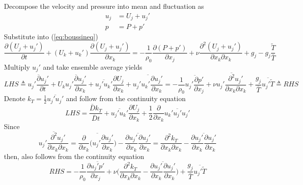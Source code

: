 \documentclass[paper=a4, fontsize=11pt]{scrartcl} %
\numberwithin{equation}{section} %
\numberwithin{figure}{section} %
\numberwithin{table}{section} %
\begin{document}
 	Decompose the velocity and pressure into mean and fluctuation as
 	\begin{equation}
 		\begin{aligned}
 			u_j & = U_j + u_j'\\
 			p & = P + p'
 		\end{aligned}
 	\end{equation}
 	Substitute into (\ref{eq:boussineq})
 	\begin{equation}
 		\frac{\partial (U_j + u_j')}{\partial t} + (U_k + u_k') \frac{\partial (U_j + u_j')}{\partial x_k} = - \frac{1}{\rho_0} \frac{\partial (P + p')}{\partial x_j} + \nu \frac{\partial^2 (U_j + u_j')}{\partial x_k \partial x_k} + g_j - g_j \frac{\tilde{T}}{\bar{T}}
 	\end{equation}
 	Multiply $u_j'$ and take ensemble average yields
 	\begin{equation}\label{eq:ea}
 		LHS \triangleq \overline{u_j' \frac{\partial u_j'}{\partial t}} + U_k \overline{u_j' \frac{\partial u_j'}{\partial x_k}} + \overline{u_j' u_k'}\frac{\partial U_j}{\partial x_k} + \overline{u_j' u_k' \frac{\partial u_j'}{\partial x_k}} = -\frac{1}{\rho_0} \overline{u_j' \frac{\partial p'}{\partial x_j}} + \nu \overline{u_j'\frac{\partial^2 u_j'}{\partial x_k \partial x_k}} + \frac{g_j}{\bar{T}}\overline{u_j' \tilde{T}} \triangleq RHS
 	\end{equation}
 	Denote $k_T = \frac{1}{2} \overline{u_j' u_j'}$ and follow from the continuity equation
 	\begin{equation}\label{eq:bl}
 		LHS = \frac{\bar{D}k_T}{\bar{D}t} + \overline{u_j' u_k'}\frac{\partial U_j}{\partial x_k} + \frac{1}{2}\frac{\partial}{\partial x_k}\overline{u_k' u_j' u_j'}
 	\end{equation}
 	Since
 	\begin{equation}
 		\overline{u_j'\frac{\partial^2 u_j'}{\partial x_k \partial x_k}} = \overline{\frac{\partial}{\partial x_k} \big(u_j'\frac{\partial u_j'}{\partial x_k}\big)} - \overline{\frac{\partial u_j'}{\partial x_k} \frac{\partial u_j'}{\partial x_k}} = \frac{\partial^2 k_T}{\partial x_k \partial x_k} - \overline{\frac{\partial u_j'}{\partial x_k} \frac{\partial u_j'}{\partial x_k}}
 	\end{equation}
 	then, also follows from the continuity equation
 	\begin{equation}\label{eq:br}
 		RHS = -\frac{1}{\rho_0} \frac{\partial \overline{u_j' p'}}{\partial x_j} + \nu \Big(\frac{\partial^2 k_T}{\partial x_k \partial x_k} - \overline{\frac{\partial u_j'}{\partial x_k} \frac{\partial u_j'}{\partial x_k}}\Big) + \frac{g_j}{\bar{T}}\overline{u_j' \tilde{T}}
 	\end{equation}
\end{document}
